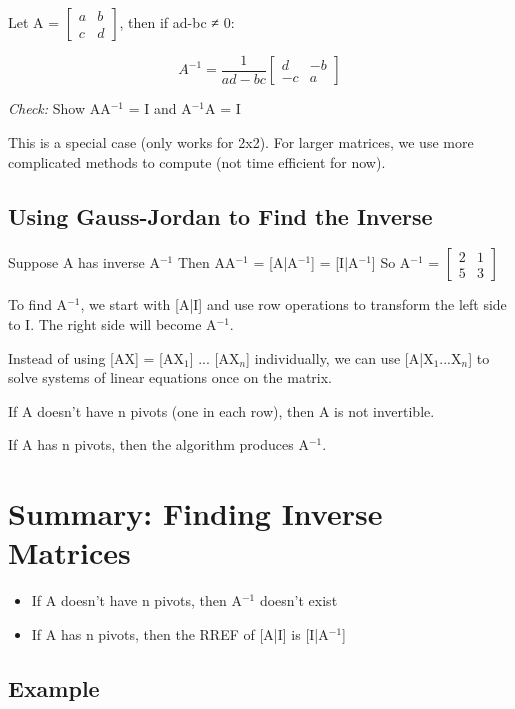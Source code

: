 \documentclass[12pt,a4paper]{article}
\begin{document}
Let A = $\begin{bmatrix} a & b \\ c & d \end{bmatrix}$, then if ad-bc ≠ 0:

\[
A^{-1} = \frac{1}{ad-bc} \begin{bmatrix} d & -b \\ -c & a \end{bmatrix}
\]

\textit{Check:} Show AA$^{-1}$ = I and A$^{-1}$A = I

This is a special case (only works for 2x2). For larger matrices, we use more complicated methods to compute (not time efficient for now).

\subsection{Using Gauss-Jordan to Find the Inverse}

Suppose A has inverse A$^{-1}$
Then AA$^{-1}$ = [A|A$^{-1}$] = [I|A$^{-1}$]
So A$^{-1}$ = $\begin{bmatrix} 2 & 1 \\ 5 & 3 \end{bmatrix}$

To find A$^{-1}$, we start with [A|I] and use row operations to transform the left side to I. The right side will become A$^{-1}$.

Instead of using [AX] = [AX$_1$] ... [AX$_n$] individually, we can use [A|X$_1$...X$_n$] to solve systems of linear equations once on the matrix.

If A doesn't have n pivots (one in each row), then A is not invertible.

If A has n pivots, then the algorithm produces A$^{-1}$.

\section{Summary: Finding Inverse Matrices}

\begin{itemize}
    \item If A doesn't have n pivots, then A$^{-1}$ doesn't exist
    \item If A has n pivots, then the RREF of [A|I] is [I|A$^{-1}$]
\end{itemize}

\subsection{Example}
\end{document}

